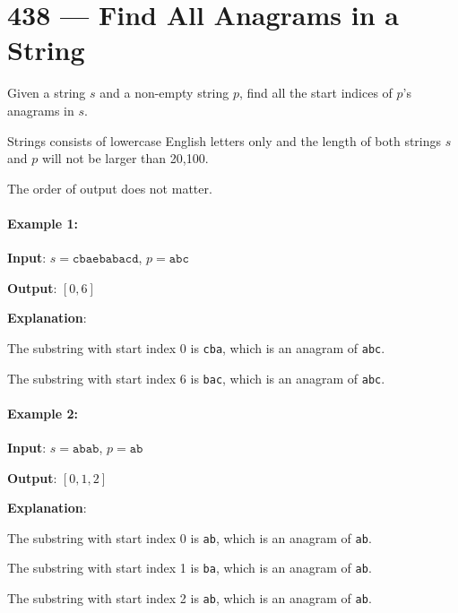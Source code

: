 \section{438 --- Find All Anagrams in a String}
Given a string $ s $ and a non-empty string $ p $, find all the start indices of $ p $'s anagrams in $ s $.

Strings consists of lowercase English letters only and the length of both strings $s$ and $p$ will not be larger than 20,100.

The order of output does not matter.

\paragraph{Example 1:}

\begin{flushleft}
\textbf{Input}: $s = \texttt{cbaebabacd}$,  $p=\texttt{abc}$

\textbf{Output}: $[0, 6]$

\textbf{Explanation}:

The substring with start index 0 is \texttt{cba}, which is an anagram of \texttt{abc}.

The substring with start index 6 is \texttt{bac}, which is an anagram of \texttt{abc}.
\end{flushleft}


\paragraph{Example 2:}

\begin{flushleft}
\textbf{Input}: $s=\texttt{abab}$, $p= \texttt{ab}$

\textbf{Output}: $[0, 1, 2]$

\textbf{Explanation}:

The substring with start index 0 is \texttt{ab}, which is an anagram of \texttt{ab}.

The substring with start index 1 is \texttt{ba}, which is an anagram of \texttt{ab}.

The substring with start index 2 is \texttt{ab}, which is an anagram of \texttt{ab}.
\end{flushleft}

